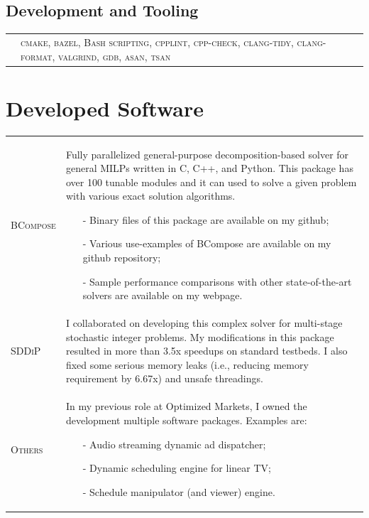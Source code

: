 \documentclass[10PT,letter]{article}
\newcommand{\subsectionstyle}[1]{\normalfont\selectfont\textcolor{titlecol}{\sffamily #1}}
\newcommand{\numbox}[1]{} %
\begin{document}
        \subsection*{\subsectionstyle{Development and Tooling}}
        		\begin{tabular}{p{.2in}p{5.55in}}
        			& 	\textsc{cmake, bazel, Bash scripting,  cpplint, cpp-check, clang-tidy, clang-format, valgrind, gdb, asan, tsan} 
        		\end{tabular}


\section*{\numbox{9}\bfseries\textcolor{titlecol}{\sffamily Developed Software}}
			\begin{tabular}{p{1.2in}p{5.55in}}
				\textsc{BCompose} &  
												Fully parallelized general-purpose decomposition-based solver for general MILPs written in C, C++, and Python. This package has over 100 tunable modules and it can used to solve a given problem with various exact solution algorithms.
												\begin{itemize}
													\item[-] Binary files of this package are available on my github;
													\item[-] Various use-examples of BCompose are available on my github repository; 
													\item[-] Sample performance comparisons with other state-of-the-art solvers are available on my webpage. 
												\end{itemize}\\[.5mm]
				\textsc{SDDiP} & 
												I collaborated on developing  this complex solver for multi-stage stochastic integer problems. My modifications in this package resulted in more than 3.5x speedups   on  standard  testbeds.  I  also fixed some serious memory leaks (i.e., reducing memory requirement by 6.67x) and unsafe threadings. \\[.5mm]
				\textsc{Others} & 
												In my previous role at Optimized Markets, I owned the development multiple software packages. Examples are:
												\begin{itemize}
													\item[-] Audio streaming dynamic ad dispatcher;
													\item[-] Dynamic scheduling engine for linear TV;
													\item[-] Schedule manipulator (and viewer) engine. 

\end{itemize}
\end{tabular}
\end{document}
